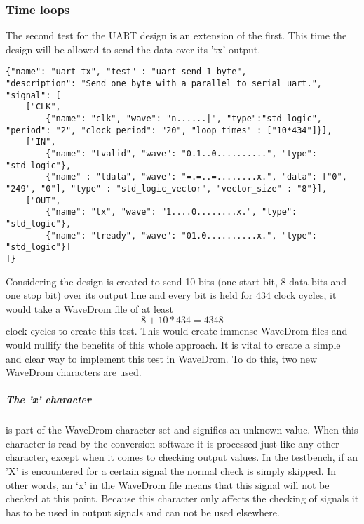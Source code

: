 \subsubsection{Time loops}
The second test for the UART design is an extension of the first. This time the design will be allowed to send the data over its 'tx' output.
\begin{lstlisting}[style=json, caption={Source file for creating a second transmission test for the UART design in \ref{appendix:uart}}, label={json:uart_wait}]
{"name": "uart_tx", "test" : "uart_send_1_byte", 
"description": "Send one byte with a parallel to serial uart.", 
"signal": [
	["CLK",
		{"name": "clk", "wave": "n......|", "type":"std_logic", "period": "2", "clock_period": "20", "loop_times" : ["10*434"]}],
	["IN",
		{"name": "tvalid", "wave": "0.1..0..........", "type": "std_logic"},
		{"name" : "tdata", "wave": "=.=..=........x.", "data": ["0", "249", "0"], "type" : "std_logic_vector", "vector_size" : "8"}],
	["OUT",
		{"name": "tx", "wave": "1....0........x.", "type": "std_logic"},
		{"name": "tready", "wave": "01.0..........x.", "type": "std_logic"}]
]}
\end{lstlisting}\nline
{}\newpage\nline
Considering the design is created to send 10 bits (one start bit, 8 data bits and one stop bit) over its output line and every bit is held for 434 clock cycles, it would take a WaveDrom file of at least
\begin{equation}
	8 + 10 * 434 = 4348
\end{equation}
clock cycles to create this test. This would create immense WaveDrom files and would nullify the benefits of this whole approach. It is vital to create a simple and clear way to implement this test in WaveDrom. To do this, two new WaveDrom characters are used.
\npar
\subparagraph{The 'x' character} is part of the WaveDrom character set and signifies an unknown value. When this character is read by the conversion software it is processed just like any other character, except when it comes to checking output values. In the testbench, if an 'X' is encountered for a certain signal the normal check is simply skipped. In other words, an ‘x’ in the WaveDrom file means that this signal will not be checked at this point. Because this character only affects the checking of signals it has to be used in output signals and can not be used elsewhere.

